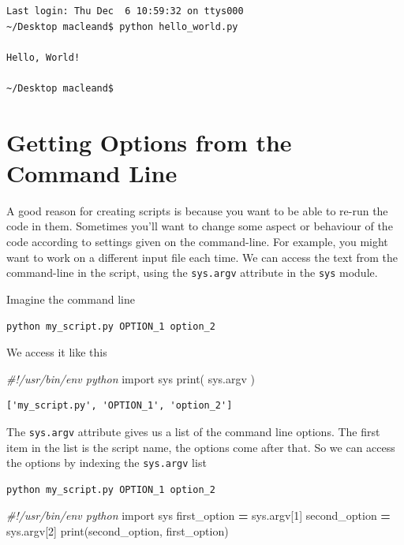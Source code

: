 \documentclass[]{book}
\newenvironment{Shaded}{\begin{snugshade}}{\end{snugshade}}
\newcommand{\BuiltInTok}[1]{#1}
\newcommand{\CommentTok}[1]{\textcolor[rgb]{0.56,0.35,0.01}{\textit{#1}}}
\newcommand{\DecValTok}[1]{\textcolor[rgb]{0.00,0.00,0.81}{#1}}
\newcommand{\ImportTok}[1]{#1}
\newcommand{\NormalTok}[1]{#1}
\newcommand{\OperatorTok}[1]{\textcolor[rgb]{0.81,0.36,0.00}{\textbf{#1}}}
\theoremstyle{definition}
\theoremstyle{definition}
\theoremstyle{definition}
\theoremstyle{remark}
\begin{document}
\begin{verbatim}
Last login: Thu Dec  6 10:59:32 on ttys000
~/Desktop macleand$ python hello_world.py

Hello, World!

~/Desktop macleand$
\end{verbatim}

\hypertarget{getting-options-from-the-command-line}{%
\section{Getting Options from the Command
Line}\label{getting-options-from-the-command-line}}

A good reason for creating scripts is because you want to be able to
re-run the code in them. Sometimes you'll want to change some aspect or
behaviour of the code according to settings given on the command-line.
For example, you might want to work on a different input file each time.
We can access the text from the command-line in the script, using the
\texttt{sys.argv} attribute in the \texttt{sys} module.

Imagine the command line

\begin{verbatim}
python my_script.py OPTION_1 option_2
\end{verbatim}

We access it like this

\begin{Shaded}
\begin{Highlighting}[]
\CommentTok{#!/usr/bin/env python}
\ImportTok{import}\NormalTok{ sys}
\BuiltInTok{print}\NormalTok{( sys.argv )}
\end{Highlighting}
\end{Shaded}

\begin{verbatim}
['my_script.py', 'OPTION_1', 'option_2']
\end{verbatim}

The \texttt{sys.argv} attribute gives us a list of the command line
options. The first item in the list is the script name, the options come
after that. So we can access the options by indexing the
\texttt{sys.argv} list

\begin{verbatim}
python my_script.py OPTION_1 option_2
\end{verbatim}

\begin{Shaded}
\begin{Highlighting}[]
\CommentTok{#!/usr/bin/env python}
\ImportTok{import}\NormalTok{ sys}
\NormalTok{first_option }\OperatorTok{=}\NormalTok{ sys.argv[}\DecValTok{1}\NormalTok{]}
\NormalTok{second_option }\OperatorTok{=}\NormalTok{ sys.argv[}\DecValTok{2}\NormalTok{]}
\BuiltInTok{print}\NormalTok{(second_option, first_option)}
\end{Highlighting}
\end{Shaded}
\end{document}
